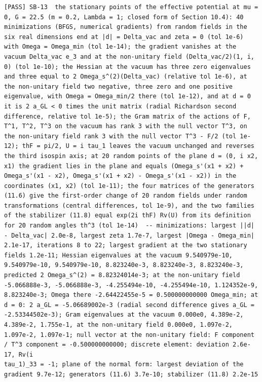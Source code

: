 \documentclass[
  10pt,
]{article}
\begin{document}
\begin{verbatim}
[PASS] SB-13  the stationary points of the effective potential at mu = 0, G = 22.5 (m = 0.2, Lambda = 1; closed form of Section 10.4): 40 minimizations (BFGS, numerical gradients) from random fields in the six real dimensions end at |d| = Delta_vac and zeta = 0 (tol 1e-6) with Omega = Omega_min (tol 1e-14); the gradient vanishes at the vacuum Delta_vac e_3 and at the non-unitary field (Delta_vac/2)(1, i, 0) (tol 1e-10); the Hessian at the vacuum has three zero eigenvalues and three equal to 2 Omega_s^(2)(Delta_vac) (relative tol 1e-6), at the non-unitary field two negative, three zero and one positive eigenvalue, with Omega = Omega_min/2 there (tol 1e-12), and at d = 0 it is 2 a_GL < 0 times the unit matrix (radial Richardson second difference, relative tol 1e-5); the Gram matrix of the actions of F, T^1, T^2, T^3 on the vacuum has rank 3 with the null vector T^3, on the non-unitary field rank 3 with the null vector T^3 - F/2 (tol 1e-12); thF = pi/2, U = i tau_1 leaves the vacuum unchanged and reverses the third isospin axis; at 20 random points of the plane d = (0, i x2, x1) the gradient lies in the plane and equals (Omega_s'(x1 + x2) + Omega_s'(x1 - x2), Omega_s'(x1 + x2) - Omega_s'(x1 - x2)) in the coordinates (x1, x2) (tol 1e-11); the four matrices of the generators (11.6) give the first-order change of 20 random fields under random transformations (central differences, tol 1e-9), and the two families of the stabilizer (11.8) equal exp(2i thF) Rv(U) from its definition for 20 random angles th^3 (tol 1e-14)  -- minimizations: largest ||d| - Delta_vac| 2.0e-8, largest zeta 1.7e-7, largest |Omega - Omega_min| 2.1e-17, iterations 8 to 22; largest gradient at the two stationary fields 1.2e-11; Hessian eigenvalues at the vacuum 9.540979e-10, 9.540979e-10, 9.540979e-10, 8.823240e-3, 8.823240e-3, 8.823240e-3, predicted 2 Omega_s^(2) = 8.82324014e-3; at the non-unitary field -5.066888e-3, -5.066888e-3, -4.255494e-10, -4.255494e-10, 1.124352e-9, 8.823240e-3; Omega there -2.64422455e-5 = 0.500000000000 Omega_min; at d = 0: 2 a_GL = -5.06689002e-3 (radial second difference gives a_GL = -2.53344502e-3); Gram eigenvalues at the vacuum 0.000e0, 4.389e-2, 4.389e-2, 1.755e-1, at the non-unitary field 0.000e0, 1.097e-2, 1.097e-2, 1.097e-1; null vector at the non-unitary field: F component / T^3 component = -0.500000000000; discrete element: deviation 2.6e-17, Rv(i
tau_1)_33 = -1; plane of the normal form: largest deviation of the gradient 9.7e-12; generators (11.6) 3.7e-10; stabilizer (11.8) 2.2e-15

\end{verbatim}
\end{document}
